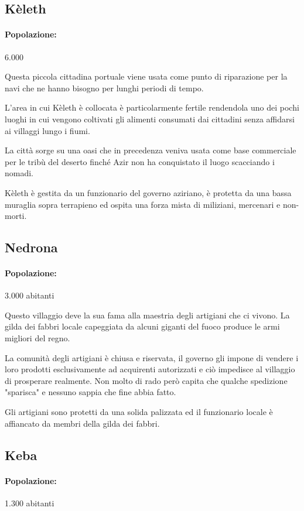 \documentclass[letterpaper,twocolumn,openany,nodeprecatedcode]{dndbook}
\begin{document}
\subsection{Kèleth}
\paragraph{Popolazione:} 6.000

Questa piccola cittadina portuale viene usata come punto di riparazione per la navi che ne hanno bisogno per lunghi periodi di tempo.

L'area in cui Kèleth è collocata è particolarmente fertile rendendola uno dei pochi luoghi in cui vengono coltivati gli alimenti consumati dai cittadini senza affidarsi ai villaggi lungo i fiumi.

La città sorge su una oasi che in precedenza veniva usata come base commerciale per le tribù del deserto finché Azir non ha conquistato il luogo scacciando i nomadi.

Kèleth è gestita da un funzionario del governo aziriano, è protetta da una bassa muraglia sopra terrapieno ed ospita una forza mista di miliziani, mercenari e non-morti.

\subsection{Nedrona}
\paragraph{Popolazione:} 3.000 abitanti

Questo villaggio deve la sua fama alla maestria degli artigiani che ci vivono. La gilda dei fabbri locale capeggiata da alcuni giganti del fuoco produce le armi migliori del regno.

La comunità degli artigiani è chiusa e riservata, il governo gli impone di vendere i loro prodotti esclusivamente ad acquirenti autorizzati e ciò impedisce al villaggio di prosperare realmente. Non molto di rado però capita che qualche spedizione "sparisca" e nessuno sappia che fine abbia fatto.

Gli artigiani sono protetti da una solida palizzata ed il funzionario locale è affiancato da membri della gilda dei fabbri.

\subsection{Keba}
\paragraph{Popolazione:} 1.300 abitanti
\end{document}
